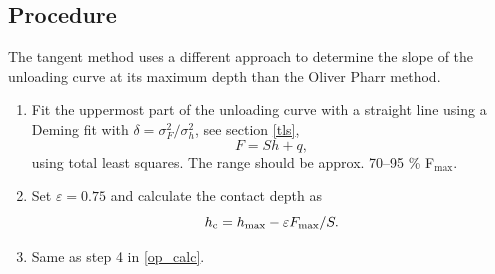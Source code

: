 \subsection{Procedure} \label{tg_calc}
The tangent method uses a different approach to determine the slope of the unloading curve at its maximum depth than the Oliver Pharr method.
\begin{enumerate}
 \item Fit the uppermost part of the unloading curve with a straight line using a Deming fit with $\delta = \sigma_F^2/\sigma_h^2$, see section \ref{tls},
 $$
 F = S h + q,
 $$
 using total least squares. The range should be approx. 70--95 \% F$_\mathrm{max}$.
 \item Set $\varepsilon = 0.75$ and calculate the contact depth as
  \begin{equation} \label{eq:hc_tg}
   h_\mathrm{c} = h_\mathrm{max} - \varepsilon F_\mathrm{max}/S.
  \end{equation}

 \item Same as step 4 in \ref{op_calc}.
\end{enumerate}

